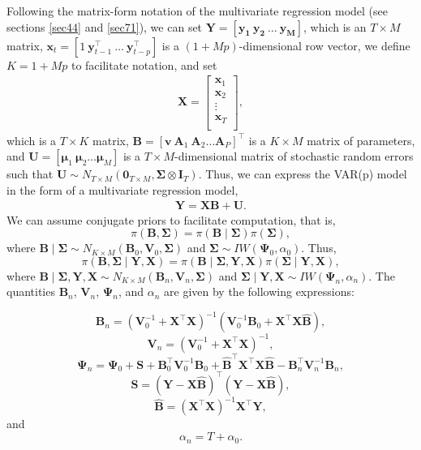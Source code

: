Following the matrix-form notation of the multivariate regression model (see sections \ref{sec44} and \ref{sec71}), we can set $\bm{Y}=\left[{\bm{y_{1}}} \ {\bm{y_{2}}} \ \ldots \ {\bm{y_{M}}}\right]$, which is an $ T\times M$ matrix, $\bm{x}_t=[1 \ \bm{y}_{t-1}^{\top} \ \dots \ \bm{y}_{t-p}^{\top}]$ is a $(1+Mp)$-dimensional row vector, we define $K=1+Mp$ to facilitate notation, and set \begin{align*}
\bm{X}=\begin{bmatrix}
	\bm{x}_1\\
	\bm{x}_2\\
	\vdots \\
	\bm{x}_T\\
\end{bmatrix},
\end{align*}
which is a $ T\times K$ matrix, $\bm{B}=\left[\bm{v} \ \bm{A}_{1} \ \bm{A}_{2} \ldots \bm{A}_{P}\right]^{\top}$ is a $ K \times M$ matrix of parameters, and $\bm{U}=\left[\bm{\mu}_{1} \ \bm{\mu}_{2}\ldots \bm{\mu}_{M}\right]$ is a $T\times M$-dimensional matrix of stochastic random errors such that $\bm{U}\sim N_{T\times M}(\bm{0}_{T\times M},\bm{\Sigma}\otimes \bm{I}_T)$. Thus, we can express the VAR(p) model in the form of a multivariate regression model,
\begin{align*}
	\bm{Y}=\bm{X}\bm{B}+\bm{U}.
\end{align*}
We can assume conjugate priors to facilitate computation, that is, 
\[
\pi({\bm{B}}, {\bm{\Sigma}}) = \pi({\bm{B}} \mid {\bm{\Sigma}}) \pi({\bm{\Sigma}}),
\]
where ${\bm{B}} \mid {\bm{\Sigma}} \sim N_{K \times M}({\bm{B}}_{0}, {\bm{V}}_{0}, {\bm{\Sigma}})$ and ${\bm{\Sigma}} \sim IW({\bm{\Psi}}_{0}, \alpha_{0})$. Thus, 
\[
\pi({\bm{B}}, {\bm{\Sigma}} \mid {\bm{Y}}, {\bm{X}}) = \pi({\bm{B}} \mid {\bm{\Sigma}}, {\bm{Y}}, {\bm{X}}) \pi({\bm{\Sigma}} \mid {\bm{Y}}, {\bm{X}}),
\]
where ${\bm{B}} \mid {\bm{\Sigma}}, {\bm{Y}}, {\bm{X}} \sim N_{K \times M}({\bm{B}}_n, {\bm{V}}_n, {\bm{\Sigma}})$ and ${\bm{\Sigma}} \mid {\bm{Y}}, {\bm{X}} \sim IW({\bm{\Psi}}_n, \alpha_n)$. The quantities ${\bm{B}}_n$, ${\bm{V}}_n$, ${\bm{\Psi}}_n$, and $\alpha_n$ are given by the following expressions:

\[
{\bm{B}}_n = ({\bm{V}}_{0}^{-1} + {\bm{X}}^{\top}{\bm{X}})^{-1}({\bm{V}}_{0}^{-1}{\bm{B}}_{0} + {\bm{X}}^{\top}{\bm{X}} \widehat{\bm{B}}),
\]
\[
{\bm{V}}_n = ({\bm{V}}_{0}^{-1} + {\bm{X}}^{\top}{\bm{X}})^{-1},
\]
\[
{\bm{\Psi}}_n = {\bm{\Psi}}_{0} + {\bm{S}} + {\bm{B}}_{0}^{\top}{\bm{V}}_{0}^{-1}{\bm{B}}_{0} + \widehat{\bm{B}}^{\top}{\bm{X}}^{\top}{\bm{X}} \widehat{\bm{B}} - {\bm{B}}_n^{\top} {\bm{V}}_n^{-1} {\bm{B}}_n,
\]
\[
{\bm{S}} = ({\bm{Y}} - {\bm{X}} \widehat{\bm{B}})^{\top}({\bm{Y}} - {\bm{X}} \widehat{\bm{B}}),
\]
\[
\widehat{\bm{B}} = ({\bm{X}}^{\top}{\bm{X}})^{-1}{\bm{X}}^{\top}{\bm{Y}},
\]
and 
\[
\alpha_n = T + \alpha_0.
\]


